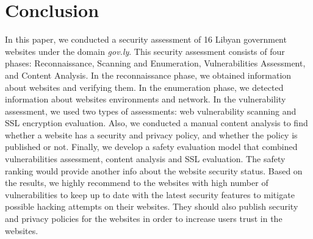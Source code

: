 \documentclass[conference]{IEEEtran}
\begin{document}
 

\section{Conclusion}


In this paper, we conducted a security assessment of 16 Libyan government
websites
under the domain \emph{gov.ly}. This security assessment consists of  four phases: Reconnaissance, Scanning and Enumeration, Vulnerabilities Assessment, and Content Analysis. In the reconnaissance phase, we obtained information about websites and verifying
them. In the enumeration phase, we detected
information about websites environments and network. In the 
vulnerability assessment, we used two types of assessments:
web vulnerability scanning and SSL
encryption evaluation. Also, we conducted a manual
content
analysis to find whether a website has a security and privacy  policy, and whether the policy is published or not.  Finally, we develop a safety evaluation model that combined vulnerabilities assessment, content analysis and SSL evaluation. The safety ranking would provide another info about the website security status.  Based on the results, we highly recommend to the websites with high number of vulnerabilities to keep up to date with the latest security features to mitigate
possible hacking attempts on their websites. They should also publish
security and privacy policies for the websites in order to increase users trust in the websites.
\end{document}

